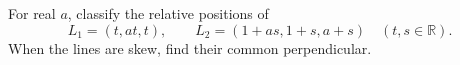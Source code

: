 For real $a$, classify the relative positions of
\[
L_1=(t,at,t),\qquad L_2=(1+as,1+s,a+s)\quad(t,s\in\mathbb R).
\]
When the lines are skew, find their common perpendicular.

